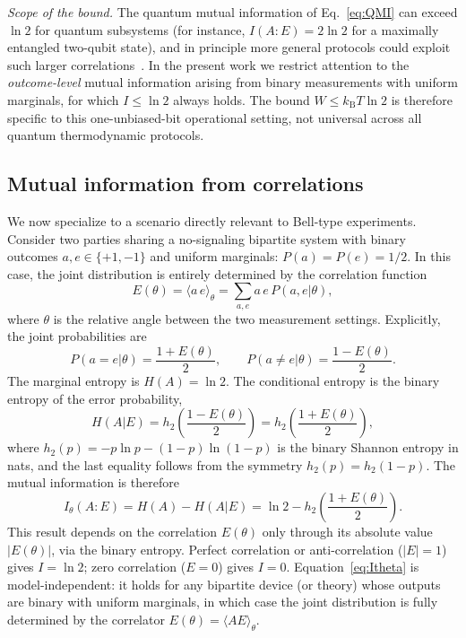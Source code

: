 \documentclass[pra,twocolumn,showpacs,preprintnumbers,amsmath,amssymb,longbibliography,
               superscriptaddress]{revtex4-2}
\begin{document}
{\emph{Scope of the bound.}
The quantum mutual information of Eq.~\eqref{eq:QMI} can exceed
$\ln 2$ for quantum subsystems (for instance,
$I(A{:}E) = 2\ln 2$ for a maximally entangled two-qubit state),
and in principle more general protocols could exploit such larger
correlations~\cite{delrio2011thermodynamic}.
In the present work we restrict attention to the
\emph{outcome-level} mutual information arising from binary
measurements with uniform marginals, for which
$I \le \ln 2$ always holds.
The bound $W \le k_{\mathrm{B}}T \ln 2$ is therefore specific to
this one-unbiased-bit operational setting, not universal across all
quantum thermodynamic protocols.}

\subsection{{Mutual information from correlations}}
\label{sec:MI_from_E}

{We now specialize to a scenario directly relevant to Bell-type
experiments.
Consider two parties sharing a no-signaling bipartite system with binary
outcomes $a, e \in \{+1, -1\}$ and uniform marginals:
$P(a) = P(e) = 1/2$.
In this case, the joint distribution is entirely determined by the
correlation function}
\begin{equation}
{E(\theta)
  = \langle a\, e \rangle_\theta
  = \sum_{a,e} a\, e\, P(a,e|\theta),}
\label{eq:corr_def}
\end{equation}
{where $\theta$ is the relative angle between the two measurement
settings.
Explicitly, the joint probabilities are
\begin{equation}
P(a = e|\theta)   = \frac{1+E(\theta)}{2},
\qquad
P(a \neq e|\theta) = \frac{1-E(\theta)}{2}.
\label{eq:joint_probs}
\end{equation}
The marginal entropy is $H(A) = \ln 2$.
The conditional entropy is the binary entropy of the error probability,
\begin{equation}
H(A|E)
  = h_2\!\left(\frac{1-E(\theta)}{2}\right)
  = h_2\!\left(\frac{1+E(\theta)}{2}\right),
\end{equation}
where $h_2(p) = -p\ln p - (1{-}p)\ln(1{-}p)$ is the binary Shannon
entropy in nats, and the last equality follows from the symmetry
$h_2(p)=h_2(1{-}p)$.
The mutual information is therefore}
\begin{equation}
I_\theta(A{:}E) = {H(A) - H(A|E) =} \ln 2
  - h_2\!\left(\frac{1+E(\theta)}{2}\right).
\label{eq:Itheta}
\end{equation}
{This result depends on the correlation $E(\theta)$ only through
its absolute value $|E(\theta)|$, via the binary entropy.
Perfect correlation or anti-correlation ($|E|=1$) gives $I = \ln 2$;
zero correlation ($E=0$) gives $I = 0$.
Equation~\eqref{eq:Itheta} is model-independent: it holds for any
bipartite device (or theory) whose outputs are binary with uniform
marginals, in which case the joint distribution is fully determined by
the correlator $E(\theta)=\langle AE\rangle_\theta$.}
\end{document}
